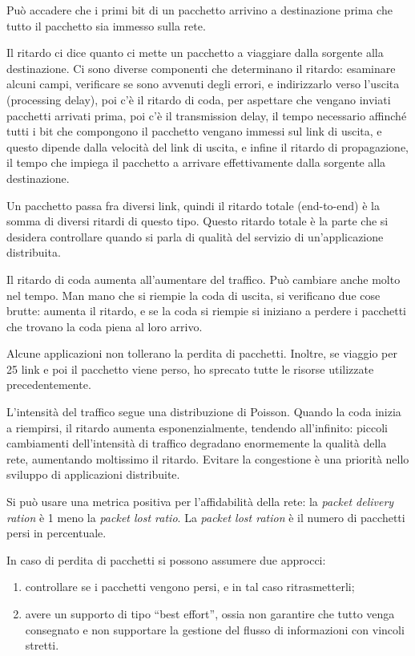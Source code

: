 Pu\`o accadere che i primi bit di un pacchetto arrivino a destinazione prima che tutto il pacchetto sia immesso sulla rete.

Il ritardo ci dice quanto ci mette un pacchetto a viaggiare dalla sorgente alla destinazione. Ci sono diverse componenti che determinano il ritardo: esaminare alcuni campi, verificare se sono avvenuti degli errori, e indirizzarlo verso l'uscita (processing delay), poi c'\`e il ritardo di coda, per aspettare che vengano inviati pacchetti arrivati prima, poi c'\`e il transmission delay, il tempo necessario affinch\'e tutti i bit che compongono il pacchetto vengano immessi sul link di uscita, e questo dipende dalla velocit\`a del link di uscita, e infine il ritardo di propagazione, il tempo che impiega il pacchetto a arrivare effettivamente dalla sorgente alla destinazione.

Un pacchetto passa fra diversi link, quindi il ritardo totale (end-to-end) \`e la somma di diversi ritardi di questo tipo. Questo ritardo totale \`e la parte che si desidera controllare quando si parla di qualit\`a del servizio di un'applicazione distribuita.

Il ritardo di coda aumenta all'aumentare del traffico. Pu\`o cambiare anche molto nel tempo. Man mano che si riempie la coda di uscita, si verificano due cose brutte: aumenta il ritardo, e se la coda si riempie si iniziano a perdere i pacchetti che trovano la coda piena al loro arrivo.

Alcune applicazioni non tollerano la perdita di pacchetti. Inoltre, se viaggio per 25 link e poi il pacchetto viene perso, ho sprecato tutte le risorse utilizzate precedentemente.

L'intensit\`a del traffico segue una distribuzione di Poisson. Quando la coda inizia a riempirsi, il ritardo aumenta esponenzialmente, tendendo all'infinito: piccoli cambiamenti dell'intensit\`a di traffico degradano enormemente la qualit\`a della rete, aumentando moltissimo il ritardo. Evitare la congestione \`e una priorit\`a nello sviluppo di applicazioni distribuite.

Si pu\`o usare una metrica positiva per l'affidabilit\`a della rete: la \emph{packet delivery ration} \`e 1 meno la \emph{packet lost ratio}. La \emph{packet lost ration} \`e il numero di pacchetti persi in percentuale.

In caso di perdita di pacchetti si possono assumere due approcci:
\begin{enumerate}
    \item controllare se i pacchetti vengono persi, e in tal caso ritrasmetterli;
    \item avere un supporto di tipo ``best effort'', ossia non garantire che tutto venga consegnato e non supportare la gestione del flusso di informazioni con vincoli stretti.
\end{enumerate}

